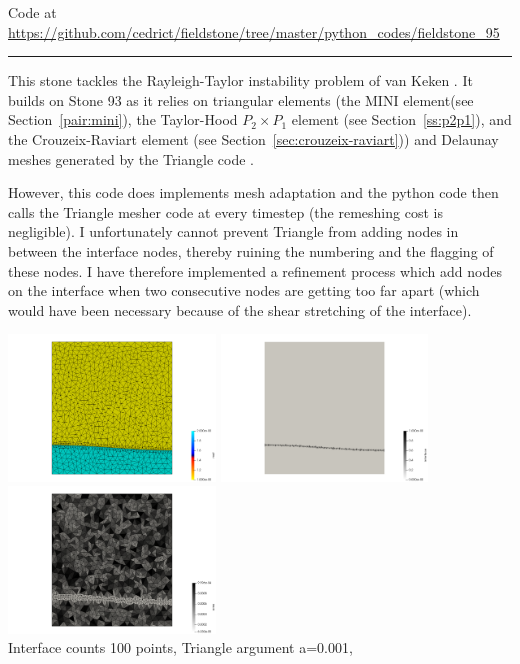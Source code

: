 

\begin{center}
Code at \url{https://github.com/cedrict/fieldstone/tree/master/python_codes/fieldstone_95}
\end{center}

\par\noindent\rule{\textwidth}{0.4pt}


This stone tackles the Rayleigh-Taylor instability problem of van Keken \etal \cite{vaks97}. 
It builds on Stone 93 as it relies on triangular elements (the MINI element(see Section~\ref{pair:mini}), 
the Taylor-Hood $P_2\times P_1$ element (see Section~\ref{ss:p2p1}), 
and the Crouzeix-Raviart element (see Section~\ref{sec:crouzeix-raviart})) and Delaunay meshes
generated by the Triangle code \cite{shew14}.  

However, this code does implements mesh adaptation and the python code then calls the Triangle mesher code
at every timestep (the remeshing cost is negligible).
I unfortunately cannot prevent Triangle from adding nodes in between the interface nodes, thereby 
ruining the numbering and the flagging of these nodes. I have therefore implemented a refinement 
process which add nodes on the interface when two consecutive nodes are getting too far apart (which 
would have been necessary because of the shear stretching of the interface). 

\begin{center}
\includegraphics[width=5.5cm]{python_codes/fieldstone_95/init/mat}
\includegraphics[width=5.5cm]{python_codes/fieldstone_95/init/interface}
\includegraphics[width=5.5cm]{python_codes/fieldstone_95/init/area}\\
{\captionfont Interface counts 100 points, Triangle argument a=0.001, } 
\end{center}

